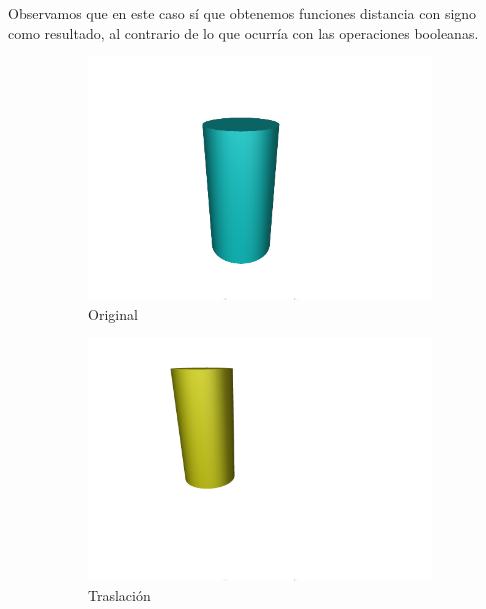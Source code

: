 Observamos que en este caso sí que obtenemos funciones distancia con signo como resultado, al contrario de lo que ocurría con las operaciones booleanas.
\begin{figure}[ht!]
    \centering
    \begin{subfigure}[b]{0.24\textwidth}
        \centering
        \includegraphics[width=\textwidth]{Plantilla-TFG-master/img/afin_og.png}
        \caption{Original}
    \end{subfigure}
    \hfill
    \begin{subfigure}[b]{0.24\textwidth}
        \centering
        \includegraphics[width=\textwidth]{Plantilla-TFG-master/img/afin_trans.png}
        \caption{Traslación}
    \end{subfigure}
    \hfill
    \begin{subfigure}[b]{0.24\textwidth}

\end{subfigure}
\end{figure}
